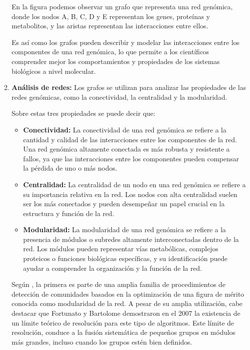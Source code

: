 \documentclass[11pt, a4paper]{article}
\begin{document}
\begin{enumerate}
  En la figura podemos observar un grafo que representa una red genómica, donde los nodos A, B, C, D y E representan los genes, proteínas y metabolitos, y las aristas representan las interacciones entre ellos.

  Es así como los grafos pueden describir y modelar las interacciones entre los componentes de una red genómica, lo que permite a los científicos comprender mejor los comportamientos y propiedades de los sistemas biológicos a nivel molecular.

   \newpage

    \item \textbf{Análisis de redes:} Los grafos se utilizan para analizar las propiedades de las redes genómicas, como la conectividad, la centralidad y la modularidad.
    
    Sobre estas tres propiedades se puede decir que:

    \begin{itemize}
      \item \textbf{Conectividad:} La conectividad de una red genómica se refiere a la cantidad y calidad de las interacciones entre los componentes de la red. Una red genómica altamente conectada es más robusta y resistente a fallos, ya que las interacciones entre los componentes pueden compensar la pérdida de uno o más nodos.
      
      \item \textbf{Centralidad:} La centralidad de un nodo en una red genómica se refiere a su importancia relativa en la red. Los nodos con alta centralidad suelen ser los más conectados y pueden desempeñar un papel crucial en la estructura y función de la red.
      
      \item \textbf{Modularidad:} La modularidad de una red genómica se refiere a la presencia de módulos o subredes altamente interconectadas dentro de la red. Los módulos pueden representar vías metabólicas, complejos proteicos o funciones biológicas específicas, y su identificación puede ayudar a comprender la organización y la función de la red.
    \end{itemize}
    
    Según \cite{berenstein2014analisis}, la primera es parte de una amplia familia de procedimientos de detección de comunidades basados en la optimización de una figura de mérito conocida como modularidad de la red. A pesar de su amplia utilización, cabe destacar que Fortunato y Bartolome demostraron en el 2007 la existencia de un límite teórico de resolución para este tipo de algoritmos. Este límite de resolución, conduce a la fusión sistemática de pequeños grupos en módulos más grandes, incluso cuando los grupos estén bien definidos.


\end{enumerate}
\end{document}
